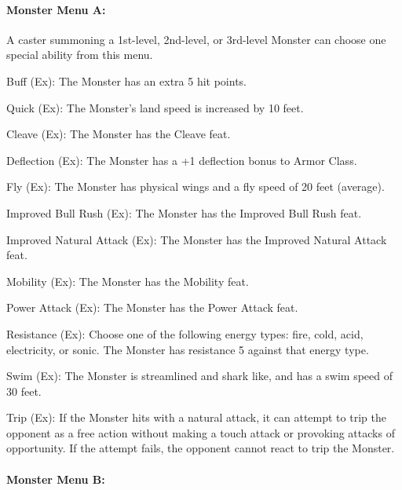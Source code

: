\paragraph{Monster Menu A:}

A caster summoning a 1st-level, 2nd-level, or 3rd-level Monster can choose one 
special ability from this menu.
\begin{list}{}{\leftmargin=1em}
\item Buff (Ex): The Monster has an extra 5 hit points.
\item Quick (Ex): The Monster's land speed is increased by 10 feet.
\item Cleave (Ex): The Monster has the Cleave feat. 
\item Deflection (Ex): The Monster has a +1 deflection bonus to Armor Class.
\item Fly (Ex): The Monster has physical wings and a fly speed of 20 feet (average).
\item Improved Bull Rush (Ex): The Monster has the Improved Bull Rush feat.
\item Improved Natural Attack (Ex): The Monster has the Improved Natural Attack feat.
\item Mobility (Ex): The Monster has the Mobility feat.
\item Power Attack (Ex): The Monster has the Power Attack feat.
\item Resistance (Ex): Choose one of the following energy types: fire, cold, acid, electricity, or sonic. 
The Monster has resistance 5 against that energy type.
\item Swim (Ex): The Monster is streamlined and shark like, and has a swim speed of 30 feet.
\item Trip (Ex): If the Monster hits with a natural attack, 
it can attempt to trip the opponent as a free action without 
making a touch attack or provoking attacks of opportunity. 
If the attempt fails, the opponent cannot react to trip the Monster.
\end{list}

\paragraph{Monster Menu B:}

